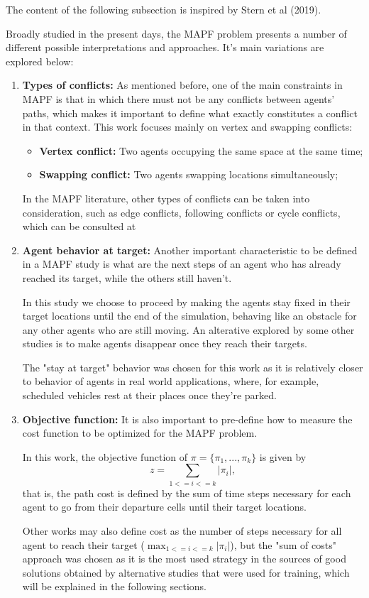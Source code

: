 The content of the following subsection is inspired by Stern et al (2019).

Broadly studied in the present days, the MAPF problem presents a number of different possible interpretations and approaches. It's main variations are explored below:

\begin{enumerate}
    \item \textbf{Types of conflicts: } As mentioned before, one of the main constraints in MAPF is that in which there must not be any conflicts between agents' paths, which makes it important to define what exactly constitutes a conflict in that context.
    This work focuses mainly on vertex and swapping conflicts:
    \begin{itemize}
        \item \textbf{Vertex conflict:} Two agents occupying the same space at the same time;
        \item \textbf{Swapping conflict:} Two agents swapping locations simultaneously;
    \end{itemize}
    In the MAPF literature, other types of conflicts can be taken into consideration, such as edge conflicts, following conflicts or cycle conflicts, which can be consulted at \cite{liAnytimeMultiAgentPath2021}
    \item \textbf{Agent behavior at target:} Another important characteristic to be defined in a MAPF study is what are the next steps of an agent who has already reached its target, while the others still haven't.

    In this study we choose to proceed by making the agents stay fixed in their target locations until the end of the simulation, behaving like an obstacle for any other agents who are still moving. An alterative explored by some other studies is to make agents disappear once they reach their targets.

    The "stay at target" behavior was chosen for this work as it is relatively closer to behavior of agents in real world applications, where, for example, scheduled vehicles rest at their places once they're parked.
    \item \textbf{Objective function: } It is also important to pre-define how to measure the cost function to be optimized for the MAPF problem.

    In this work, the objective function of \(\pi = \{\pi_1,...,\pi_k\}\) is given by
    \[
    z = \sum_{1<=i<=k}|\pi_i|,
    \]
    that is, the path cost is defined by the sum of time steps necessary for each agent to go from their departure cells until their target locations.

    Other works may also define cost as the number of steps necessary for all agent to reach their target (\(\max_{1<=i<=k}|\pi_i|\)), but the "sum of costs" approach was chosen as it is the most used strategy in the sources of good solutions obtained by alternative studies that were used for training, which will be explained in the following sections.
\end{enumerate}

